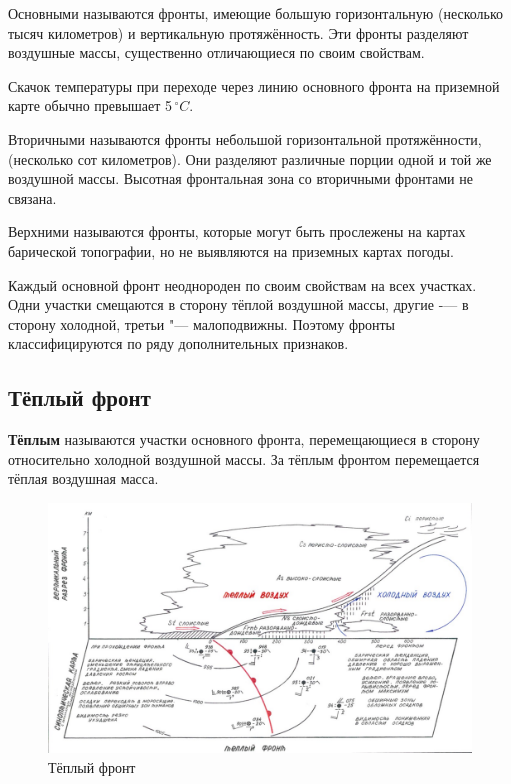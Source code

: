 \documentclass[a4paper, 12pt, twoside, final, book, russian, fittopage, cyremdash, openright]{ncc}
\newcommand{\grC}{\ensuremath{\,^\circ{}C}\xspace}
\begin{document}
Основными называются фронты, имеющие большую горизонтальную
(несколько тысяч километров) и вертикальную протяжённость. Эти фронты
разделяют воздушные массы, существенно отличающиеся по своим
свойствам.

Скачок температуры при переходе через линию основного фронта на
приземной карте обычно превышает 5\grC.

Вторичными называются фронты небольшой горизонтальной протяжённости,
(несколько сот километров).  Они разделяют различные порции одной и
той же воздушной массы. Высотная фронтальная зона со вторичными
фронтами не связана.

Верхними называются фронты, которые могут быть прослежены на картах
барической топографии, но не выявляются на приземных картах погоды.

Каждый основной фронт неоднороден по своим свойствам на всех
участках. Одни участки смещаются в сторону тёплой воздушной массы,
другие \--— в сторону холодной, третьи "--- малоподвижны. Поэтому фронты
классифицируются по ряду дополнительных признаков.

\subsection{Тёплый фронт}
\label{sec:warm_front}

\textbf{Тёплым} называются участки основного фронта, перемещающиеся в сторону
относительно холодной воздушной массы. За тёплым фронтом перемещается
тёплая воздушная масса.

\begin{figure}[htb]
   \centering
   \includegraphics[scale=0.7]{06_warm_front.pdf}
   \caption{Тёплый фронт}
   \label{fig:06_warm_front}
\end{figure}
\end{document}
